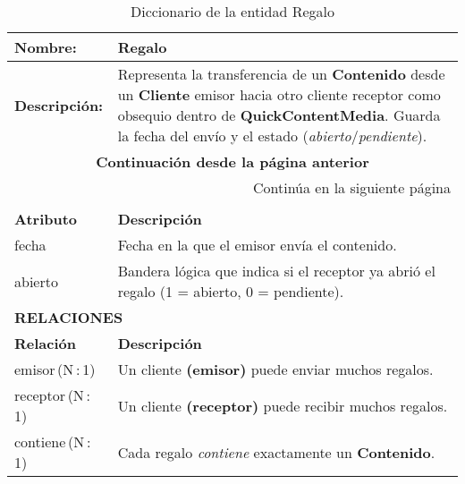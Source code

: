 \renewcommand{\arraystretch}{1.3}
\begin{longtable}{|p{3.5cm}|p{10cm}|}
\caption{Diccionario de la entidad Regalo}
\label{tab:diccionarioRegalo} \\ 
\hline
\textbf{Nombre:} & Regalo \\
\hline
\textbf{Descripción:} & 
Representa la transferencia de un \textbf{Contenido} desde un
\textbf{Cliente} emisor hacia otro cliente receptor como obsequio
dentro de \textbf{QuickContentMedia}.  Guarda la fecha del envío y el
estado (\textit{abierto}/\textit{pendiente}). \\ \hline
\endfirsthead

\multicolumn{2}{c}{\textbf{Continuación desde la página anterior}} \\ 
\endhead

\hline \multicolumn{2}{r}{{Continúa en la siguiente página}} \\ 
\endfoot

\hline
\endlastfoot

\multicolumn{2}{|p{13.5cm}|}{\textbf{ATRIBUTOS}} \\ \hline
\textbf{Atributo} & \textbf{Descripción} \\ \hline
fecha        & Fecha en la que el emisor envía el contenido. \\ \hline
abierto      & Bandera lógica que indica si el receptor ya abrió el regalo
(1 = abierto, 0 = pendiente). \\ \hline

\multicolumn{2}{|p{13.5cm}|}{\textbf{RELACIONES}} \\ \hline
\textbf{Relación} & \textbf{Descripción} \\ \hline
emisor\,(N\,:\,1)   & Un cliente \textbf{(emisor)} puede enviar muchos regalos. \\ \hline
receptor\,(N\,:\,1) & Un cliente \textbf{(receptor)} puede recibir muchos regalos. \\ \hline
contiene\,(N\,:\,1) & Cada regalo \emph{contiene} exactamente un \textbf{Contenido}.\\ \hline
\end{longtable}